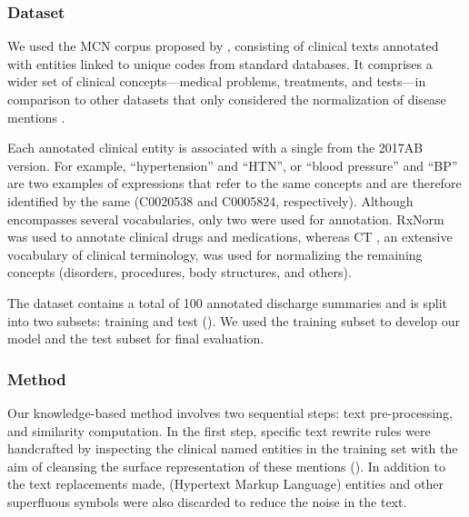 \subsubsection{Dataset}

We used the MCN corpus proposed by \textcite{luo2019a}, consisting of clinical texts annotated with entities linked to unique codes from standard databases.
It comprises a wider set of clinical concepts---medical problems, treatments, and tests---in comparison to other datasets that only considered the normalization of disease mentions \parencite{pradhan2013a,pradhan2014a,elhadad2015a}.

Each annotated clinical entity is associated with a single  from the  2017AB version.
For example, ``hypertension'' and ``HTN'', or ``blood pressure'' and ``BP'' are two examples of expressions that refer to the same concepts and are therefore identified by the same  (C0020538 and C0005824, respectively).
Although  encompasses several vocabularies, only two were used for annotation.
RxNorm \parencite{nelson2011a} was used to annotate clinical drugs and medications, whereas  CT \parencite{stearns2001a}, an extensive vocabulary of clinical terminology, was used for normalizing the remaining concepts (disorders, procedures, body structures, and others).

The dataset contains a total of 100 annotated discharge summaries and is split into
two subsets: training and test ().
We used the training subset to develop our model and the test subset for final evaluation.




\subsubsection{Method}

Our knowledge-based method involves two sequential steps: text pre-processing, and similarity computation.
In the first step, specific text rewrite rules were handcrafted by inspecting the clinical named entities in the training set with the aim of cleansing the surface representation of these mentions ().
In addition to the text replacements made,  (Hypertext Markup Language) entities and other superfluous symbols were also discarded to reduce the noise in the text.



